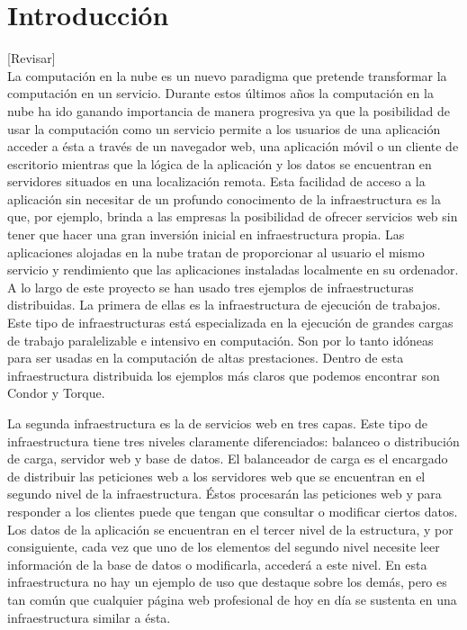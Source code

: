 \chapter{Introducción}
\label{cap:introduccion}

[Revisar]\\

La computación en la nube es un nuevo paradigma que pretende transformar la computación en un servicio. Durante estos últimos años la computación en la nube ha ido ganando importancia de manera progresiva ya que la posibilidad de usar la computación como un servicio permite a los usuarios de una aplicación acceder a ésta a través de un navegador web, una aplicación móvil o un cliente de escritorio mientras que la lógica de la aplicación y los datos se encuentran en servidores situados en una localización remota. Esta facilidad de acceso a la aplicación sin necesitar de un profundo conocimento de la infraestructura es la que, por ejemplo, brinda a las empresas la posibilidad de ofrecer servicios web sin tener que hacer una gran inversión inicial en infraestructura propia. Las aplicaciones alojadas en la nube tratan de proporcionar al usuario el mismo servicio y rendimiento que las aplicaciones instaladas localmente en su ordenador.\\

A lo largo de este proyecto se han usado tres ejemplos de infraestructuras distribuidas. La primera de ellas es la infraestructura de ejecución de trabajos. Este tipo de infraestructuras está especializada en la ejecución de grandes cargas de trabajo paralelizable e intensivo en computación. Son por lo tanto idóneas para ser usadas en la computación de altas prestaciones. Dentro de esta infraestructura distribuida los ejemplos más claros que podemos encontrar son Condor y Torque.

La segunda infraestructura es la de servicios web en tres capas. Este tipo de infraestructura tiene tres niveles claramente diferenciados: balanceo o distribución de carga, servidor web y base de datos. El balanceador de carga es el encargado de distribuir las peticiones web a los servidores web que se encuentran en el segundo nivel de la infraestructura. Éstos procesarán las peticiones web y para responder a los clientes puede que tengan que consultar o modificar ciertos datos. Los datos de la aplicación se encuentran en el tercer nivel de la estructura, y por consiguiente, cada vez que uno de los elementos del segundo nivel necesite leer información de la base de datos o modificarla, accederá a este nivel. En esta infraestructura no hay un ejemplo de uso que destaque sobre los demás, pero es tan común que cualquier página web profesional de hoy en día se sustenta en una infraestructura similar a ésta.

